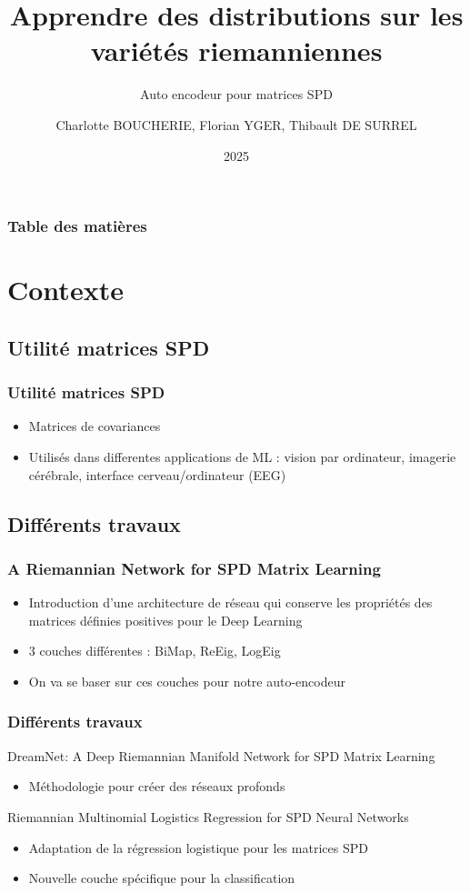 \documentclass{beamer}
\title[AE SPDnet]
{Apprendre des distributions sur les variétés riemanniennes}
\subtitle{Auto encodeur pour matrices SPD}
\author[CB]
{Charlotte BOUCHERIE, Florian YGER, Thibault DE SURREL}
\institute{LITIS}
\date[2025]
{2025}
\begin{document}
\frame{\titlepage}

\begin{frame}
\frametitle{Table des matières}
\tableofcontents
\end{frame}

\section{Contexte}
\subsection{Utilité matrices SPD}
\begin{frame}
\frametitle{Utilité matrices SPD}
    \begin{itemize}
        \item Matrices de covariances 
        \item Utilisés dans differentes applications de ML : vision par ordinateur, imagerie cérébrale, interface cerveau/ordinateur (EEG)  
    \end{itemize}
\end{frame}
\subsection{Différents travaux}
\begin{frame}
\frametitle{A Riemannian Network for SPD Matrix Learning}
\begin{itemize}
\item Introduction d'une architecture de réseau qui conserve les propriétés des matrices définies positives pour le Deep Learning
\item 3 couches différentes : BiMap, ReEig, LogEig
\item On va se baser sur ces couches pour notre auto-encodeur
\end{itemize}

\end{frame}
\begin{frame}
\frametitle{Différents travaux}
DreamNet: A Deep Riemannian Manifold Network for SPD Matrix Learning
\begin{itemize}
    \item Méthodologie pour créer des réseaux profonds
\end{itemize}
Riemannian Multinomial Logistics Regression for SPD Neural Networks
\begin{itemize}
    \item Adaptation de la régression logistique pour les matrices SPD
    \item Nouvelle couche spécifique pour la classification
\end{itemize}
\end{frame}
\end{document}

